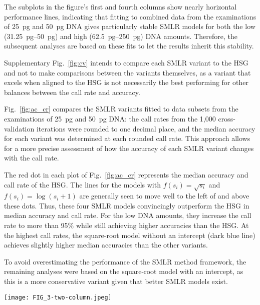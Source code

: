 \documentclass[preprint,5p,times,11pt]{elsarticle}
\begin{document}
The subplots in the figure's first and fourth columns show nearly horizontal performance lines, indicating that fitting to combined data from the examinations of \SI{25}{\pg} and \SI{50}{\pg} DNA gives particularly stable SMLR models for both the low (\SIrange[range-units = single, range-phrase = --]{31.25}{50}{\pg}) and high (\SIrange[range-units = single, range-phrase = --]{62.5}{250}{\pg}) DNA amounts.
Therefore, the subsequent analyses are based on these fits to let the results inherit this stability.

Supplementary Fig.~\ref{fig:cv} intends to compare each SMLR variant to the HSG and not to make comparisons between the variants themselves, as a variant that excels when aligned to the HSG is not necessarily the best performing for other balances between the call rate and accuracy.

Fig.~\ref{fig:ac_cr} compares the SMLR variants fitted to data subsets from the examinations of \SI{25}{\pg} and \SI{50}{\pg} DNA:
the call rates from the 1,000 cross-validation iterations were rounded to one decimal place, and the median accuracy for each variant was determined at each rounded call rate.
This approach allows for a more precise assessment of how the accuracy of each SMLR variant changes with the call rate.

The red dot in each plot of Fig.~\ref{fig:ac_cr} represents the median accuracy and call rate of the HSG.
The lines for the models with $f(s_i) = \sqrt{s_i}$ and $f(s_i) = \log(s_i+1)$ are generally seen to move well to the left of and above these dots.
Thus, these four SMLR models convincingly outperform the HSG in median accuracy and call rate.
For the low DNA amounts, they increase the call rate to more than 95\% while still achieving higher accuracies than the HSG.
At the highest call rates, the square-root model without an intercept (dark blue line) achieves slightly higher median accuracies than the other variants.

To avoid overestimating the performance of the SMLR method framework, the remaining analyses were based on the square-root model with an intercept, as this is a more conservative variant given that better SMLR models exist.
\begin{figure*}
\centering
\texttt{[image: FIG\_3-two-column.jpeg]}
\caption{
Median accuracy versus call rate from aggregated results of cross-validations (legend applies to both plots).\\
Each line represents the median accuracies calculated from binned call rate data of 1,000 cross-validation iterations, where the six SMLR models were fitted to and tested on data from the examinations of the DNA quantities indicated above the plots.
The red dot in each plot shows the median accuracy and call rate for the HID SNP Genotyper Plugin.
Note that the two plots use different axes scales, and that the first axes have been reversed to align with Fig.~\ref{fig:accr_vs_q_low}, where increasing $q$ leads to decreasing call rates.
}
\label{fig:ac_cr}
\end{figure*}
\end{document}
